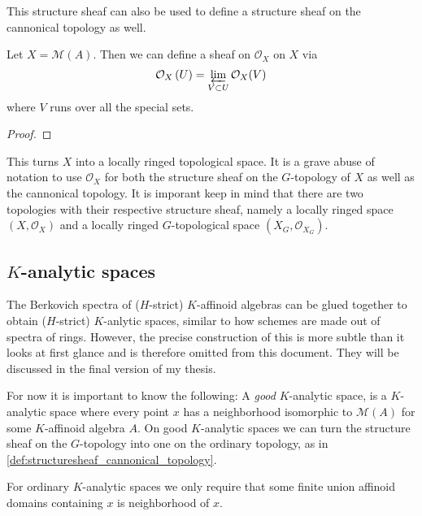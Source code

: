 This structure sheaf can also be used to define a structure sheaf on the cannonical topology as well. 
\begin{definition}\label{def:structuresheaf_cannonical_topology}
	Let $X = \mathcal{M} (A)$. Then we can define a sheaf on $\mathcal{O}_X$ on $X$ via \[
		\mathcal{O}_X\left( U \right)  = \varprojlim_{V \subset U} \mathcal{O}_X(V)
	\]   
	where $V$ runs over all the special sets.
\end{definition}
\begin{proof}
\end{proof}
This turns $X$ into a locally ringed topological space. 
It is a grave abuse of notation to use $\mathcal{O}_X$ for both the structure sheaf on the $G$-topology of $X$ as well as the cannonical topology. 
It is imporant keep in mind that there are two topologies with their respective structure sheaf, namely a locally ringed space $(X, \mathcal{O}_X)$ and a locally ringed $G$-topological space $(X_G, \mathcal{O}_{X_G})$. 


\subsection{$K$-analytic spaces} \label{sec:k_analytic_spaces}

The Berkovich spectra of ($H$-strict) $K$-affinoid algebras can be glued together to obtain ($H$-strict) $K$-anlytic spaces, similar to how schemes are made out of spectra of rings. 
However, the precise construction of this is more subtle than it looks at first glance and is therefore omitted from this document. 
They will be discussed in the final version of my thesis. 

For now it is important to know the following:
A \emph{good} $K $-analytic space, is a $K$-analytic space where every point $x$ has a neighborhood isomorphic to $\mathcal{M} (A)$ for some $K$-affinoid algebra $A$. 
On good  $K$-analytic spaces we can turn the structure sheaf on the $G$-topology into one on the ordinary topology, as in  \cref{def:structuresheaf_cannonical_topology}. 

For ordinary $K$-analytic spaces we only require that some finite union affinoid domains containing $x$ is neighborhood of $x$. 



